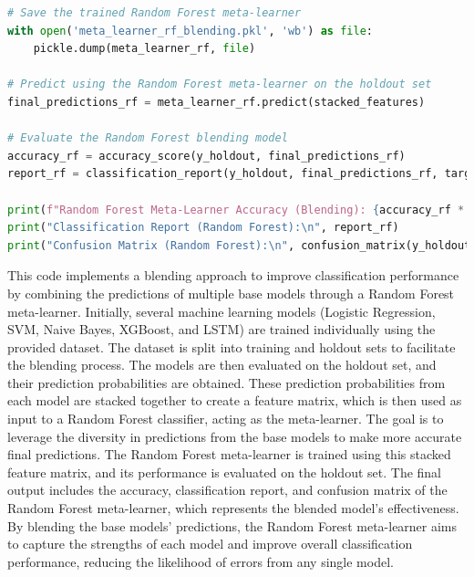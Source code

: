 \begin{tcolorbox}[colback=gray!5!white, colframe=gray!80!black, boxrule=0.5pt, title=Blending with Random Forest as Meta-Learner]
    \begin{lstlisting}[language=Python]
# Save the trained Random Forest meta-learner
with open('meta_learner_rf_blending.pkl', 'wb') as file:
    pickle.dump(meta_learner_rf, file)

# Predict using the Random Forest meta-learner on the holdout set
final_predictions_rf = meta_learner_rf.predict(stacked_features)

# Evaluate the Random Forest blending model
accuracy_rf = accuracy_score(y_holdout, final_predictions_rf)
report_rf = classification_report(y_holdout, final_predictions_rf, target_names=label_encoder.classes_)

print(f"Random Forest Meta-Learner Accuracy (Blending): {accuracy_rf * 100:.2f}%")
print("Classification Report (Random Forest):\n", report_rf)
print("Confusion Matrix (Random Forest):\n", confusion_matrix(y_holdout, final_predictions_rf))
    \end{lstlisting}
\end{tcolorbox}

\noindent
This code implements a blending approach to improve classification performance by combining the predictions of multiple base models through a Random Forest meta-learner. Initially, several machine learning models (Logistic Regression, SVM, Naive Bayes, XGBoost, and LSTM) are trained individually using the provided dataset. The dataset is split into training and holdout sets to facilitate the blending process. The models are then evaluated on the holdout set, and their prediction probabilities are obtained. These prediction probabilities from each model are stacked together to create a feature matrix, which is then used as input to a Random Forest classifier, acting as the meta-learner. The goal is to leverage the diversity in predictions from the base models to make more accurate final predictions. The Random Forest meta-learner is trained using this stacked feature matrix, and its performance is evaluated on the holdout set. The final output includes the accuracy, classification report, and confusion matrix of the Random Forest meta-learner, which represents the blended model's effectiveness. By blending the base models’ predictions, the Random Forest meta-learner aims to capture the strengths of each model and improve overall classification performance, reducing the likelihood of errors from any single model.

